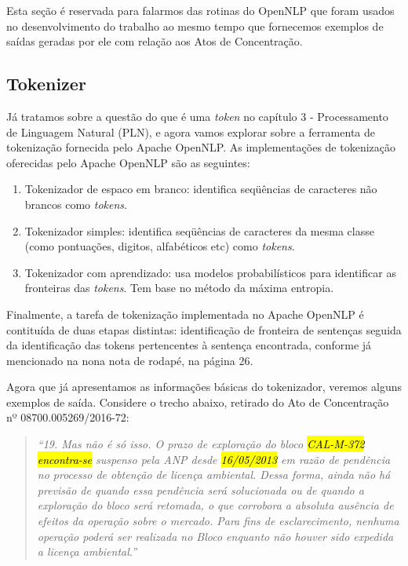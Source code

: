 \documentclass[11pt]{report}
\newcommand{\quotes}[1]{``#1''}
\begin{document}
Esta seção é reservada para falarmos das rotinas do OpenNLP que foram usados no desenvolvimento do trabalho
ao mesmo tempo que fornecemos exemplos de saídas geradas por ele com relação aos Atos de Concentração.


\subsection{Tokenizer}

\indent\indent Já tratamos sobre a questão do que é uma \textit{token} no capítulo 3 - Processamento de Linguagem Natural (PLN), e agora vamos explorar sobre a ferramenta de
tokenização fornecida pelo Apache OpenNLP. As implementações de tokenização oferecidas pelo Apache OpenNLP são as seguintes:

\begin{enumerate}[label=\textbf{{\Roman*.}}]
  \item Tokenizador de espaco em branco: identifica seqüências de caracteres não brancos como \textit{tokens}.
  \item Tokenizador simples: identifica seqüências de caracteres da mesma classe (como pontuações, digitos, alfabéticos etc) como \textit{tokens}. 
  \item Tokenizador com aprendizado: usa modelos probabilísticos para identificar as fronteiras das \textit{tokens}. Tem base no método da máxima entropia.
\end{enumerate}

Finalmente, a tarefa de tokenização implementada no Apache OpenNLP é contituída de duas etapas distintas: identificação de fronteira de sentenças seguida da identificação das 
tokens pertencentes à sentença encontrada, conforme já mencionado na nona nota de rodapé, na página 26. 

Agora que já apresentamos as informações básicas do tokenizador, veremos alguns exemplos de saída. Considere o trecho abaixo, retirado do Ato de Concentração nº 08700.005269/2016-72:

\begin{quote}
  \textit{\quotes{19. Mas não é só isso. O prazo de exploração do bloco \hl{CAL-M-372} \hl{encontra-se} suspenso pela ANP desde \hl{16/05/2013} em razão de pendência no processo de obtenção de licença ambiental. Dessa forma, ainda não há previsão de quando essa pendência será solucionada ou de quando a exploração do bloco será retomada, o que corrobora a absoluta ausência de efeitos da operação sobre o mercado. Para fins de esclarecimento, nenhuma operação poderá ser realizada no Bloco enquanto não houver sido expedida a licença ambiental.}}
\end{quote}
\end{document}
